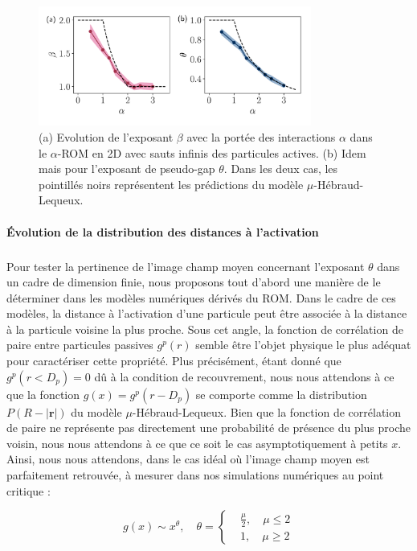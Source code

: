 \begin{figure}[h]
	\centering
	\includegraphics[width=0.8\textwidth]{Chapitre3/Figures/Interpretation/beta_alphaMF.pdf}
	\caption{(a) Evolution de l'exposant $\beta$ avec la portée des interactions $\alpha$ dans le $\alpha$-ROM en 2D avec sauts infinis des particules actives. (b) Idem mais pour l'exposant de pseudo-gap $\theta$. Dans les deux cas, les pointillés noirs représentent les prédictions du modèle $\mu$-Hébraud-Lequeux.}
	\label{fig:mueff}
\end{figure}

\paragraph{Évolution de la distribution des distances à l'activation}

\subparagraph{}Pour tester la pertinence de l'image champ moyen concernant l'exposant $\theta$ dans un cadre de dimension finie, nous proposons tout d'abord une manière de le déterminer dans les modèles numériques dérivés du ROM. Dans le cadre de ces modèles, la distance à l'activation d'une particule peut être associée à la distance à la particule voisine la plus proche. Sous cet angle, la fonction de corrélation de paire entre particules passives $g^p(r)$ semble être l'objet physique le plus adéquat pour caractériser cette propriété. Plus précisément, étant donné que $g^p(r<D_p)=0$ dû à la condition de recouvrement, nous nous attendons à ce que la fonction $g(x) = g^p(r-D_p)$ se comporte comme la distribution $P(R-|\mathbf{r}|)$ du modèle $\mu$-Hébraud-Lequeux. Bien que la fonction de corrélation de paire ne représente pas directement une probabilité de présence du plus proche voisin, nous nous attendons à ce que ce soit le cas asymptotiquement à petits $x$. Ainsi, nous nous attendons, dans le cas idéal où l'image champ moyen est parfaitement retrouvée, à mesurer dans nos simulations numériques au point critique :

\begin{equation}
	g(x) \sim x^\theta, \quad \theta = \left\{
	\begin{aligned}
	&\frac{\mu}{2}, \quad \mu \leq 2\\
	&1, \quad \mu \geq 2
	\end{aligned}
	\right.
	\label{eq:gpass}
\end{equation}

